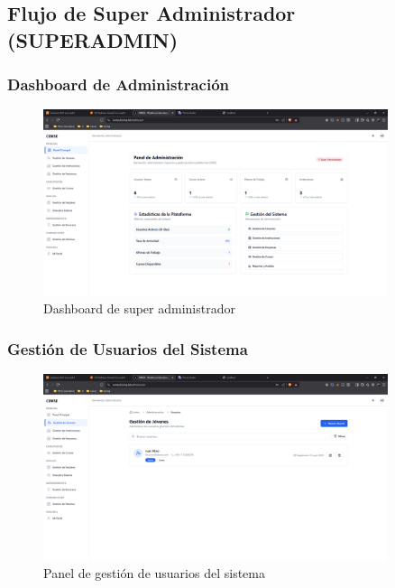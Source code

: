 \documentclass[12pt,a4paper]{article}
\begin{document}
\begin{enumerate}
\subsection{Flujo de Super Administrador (SUPERADMIN)}

\subsubsection{Dashboard de Administración}
\begin{figure}[H]
    \centering
    \includegraphics[width=0.9\textwidth]{screenshots/admin/dashboard.png}
    \caption{Dashboard de super administrador}
    \label{fig:admin-dashboard}
\end{figure}

\subsubsection{Gestión de Usuarios del Sistema}
\begin{figure}[H]
    \centering
    \includegraphics[width=0.9\textwidth]{screenshots/admin/user-management.png}
    \caption{Panel de gestión de usuarios del sistema}
    \label{fig:admin-users}
\end{figure}


\end{enumerate}
\end{document}
